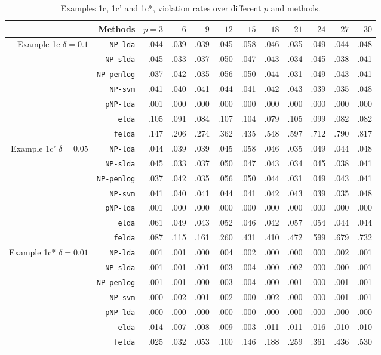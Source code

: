 \documentclass[12pt]{article}
\numberwithin{equation}{section}
\theoremstyle{remark}
\newcommand{\1}{{\rm 1}\kern-0.24em{\rm I}}
\begin{document}
\begin{appendices}
\begin{table}[t]
\caption{Examples 1c, 1c' and 1c*,  violation rates over different $p$ and methods. \label{tb::simu1cc'}}
\centering
\renewcommand{\arraystretch}{0.6}
\begin{tabular}{r|rrrrrrrrrrr}
\hline
&Methods&$p=3$&$6$&$9$&$12$&$15$&$18$&$21$&$24$&$27$&$30$\\
\hline
\multirow{7}{2cm}{Example 1c   $\delta=0.1$}
&\texttt{NP-lda}&.044&.039&.039&.045&.058&.046&.035&.049&.044&.048\\
 &\texttt{NP-slda}&.045&.033&.037&.050&.047&.043&.034&.045&.038&.041\\
&\texttt{NP-penlog}&.037&.042&.035&.056&.050&.044&.031&.049&.043&.041\\
&\texttt{NP-svm}&.041&.040&.041&.044&.041&.042&.043&.039&.035&.048\\
 &\texttt{pNP-lda}&.001&.000&.000&.000&.000&.000&.000&.000&.000&.000\\
 &\texttt{elda}&.105&.091&.084&.107&.104&.079&.105&.099&.082&.082\\
&\texttt{felda}&.147&.206&.274&.362&.435&.548&.597&.712&.790&.817\\
\hline
\multirow{7}{2cm}{Example 1c' $\delta=0.05$}
&\texttt{NP-lda}&.044&.039&.039&.045&.058&.046&.035&.049&.044&.048\\
 &\texttt{NP-slda}&.045&.033&.037&.050&.047&.043&.034&.045&.038&.041\\
&\texttt{NP-penlog}&.037&.042&.035&.056&.050&.044&.031&.049&.043&.041\\
&\texttt{NP-svm}&.041&.040&.041&.044&.041&.042&.043&.039&.035&.048\\
 &\texttt{pNP-lda}&.001&.000&.000&.000&.000&.000&.000&.000&.000&.000\\
 &\texttt{elda}&.061&.049&.043&.052&.046&.042&.057&.054&.044&.044\\
&\texttt{felda}&.087&.115&.161&.260&.431&.410&.472&.599&.679&.732\\
\hline
\multirow{7}{2cm}{Example 1c* $\delta=0.01$}
&\texttt{NP-lda}&.001&.001&.000&.004&.002&.000&.000&.000&.002&.001\\
 &\texttt{NP-slda}&.001&.001&.001&.003&.004&.000&.002&.000&.000&.001\\
&\texttt{NP-penlog}&.001&.001&.000&.003&.004&.000&.001&.000&.001&.001\\
&\texttt{NP-svm}&.000&.002&.001&.002&.000&.002&.000&.000&.001&.001\\
 &\texttt{pNP-lda}&.000&.000&.000&.000&.000&.000&.000&.000&.000&.000\\
 &\texttt{elda}&.014&.007&.008&.009&.003&.011&.011&.016&.010&.010\\
&\texttt{felda}&.025&.032&.053&.100&.146&.188&.259&.361&.436&.530\\
\hline
\end{tabular}
\end{table}



\end{appendices}
\end{document}
